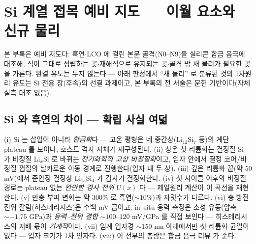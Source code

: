 \section{Si 계열 접목 예비 지도 --- 이월 요소와 신규 물리}\label{sec:appendix-si}
본 부록은 예비 지도다: 흑연$\cdot$LCO 에 걸린 본문 골격($\mathrm{N0}$--$\mathrm{N9}$)을 실리콘 합금
음극에 대조해, 식이 그대로 성립하는 곳$\cdot$재해석으로 유지되는 곳$\cdot$골격 밖 새 물리가 필요한 곳을
가른다. 완결 유도는 두지 않는다 --- 아래 판정에서 ``새 물리'' 로 분류된 것의 1차원리 유도는 Si 전용
장(후속)의 선결 과제이고, 본 부록의 전 서술은 문헌 기반이다(자체 실측 대조 없음).

\subsection{Si 와 흑연의 차이 --- 확립 사실 여덟}\label{ssec:si-facts}
(i) Si 는 삽입이 아니라 \emph{합금화}다 --- 고온 평형은 네 중간상(Li$_{12}$Si$_7$ 등)의 계단
plateau 를 보이나\cite{wen_huggins1981}, 호스트 격자 자체가 재구성된다. (ii) 상온 첫 리튬화는
결정질 Si 가 비정질 Li$_x$Si 로 바뀌는 \emph{전기화학적 고상 비정질화}이고, 입자 안에서 결정
코어/비정질 껍질의 날카로운 이동 경계로 진행한다(입자 내 두-상)\cite{limthongkul2003,li_dahn2007}.
(iii) 깊은 리튬화 끝(약 $50$ mV)에서 준안정 결정상 Li$_{15}$Si$_4$ 가 갑자기
결정화한다\cite{obrovac_christensen2004}. (iv) 첫 사이클 이후의 비정질 경로는 plateau 없는 \emph{완만한
경사 전위} $U(x)$ 다 --- 제일원리 계산이 이 곡선을 재현한다\cite{chevrier_dahn2009}. (v) 만충 부피
변화는 약 $300\%$ 로\cite{beaulieu2001} 흑연($\sim10\%$)과 자릿수가 다르다. (vi) 충$\cdot$방전 전위
갈림(히스테리시스)은 수백 mV 급이고, in~situ 응력 측정은 소성 유동(압축 $\sim-1.75$ GPa)과
\emph{응력--전위 결합} $\sim100$--$120$ mV/GPa 를 직접 보인다\cite{sethuraman_stressevo2010,
sethuraman_stresspot2010} --- 히스테리시스의 지배 몫이 \emph{기계적}이다. (vii) 임계 입자경
$\sim150$ nm 아래에서만 첫 리튬화 균열이 없다 --- 입자 크기가 1차 인자다\cite{liu_sizefracture2012}.
(viii) 이 전부의 총람은 합금 음극 리뷰\cite{obrovac_chevrier2014} 가 준다.

